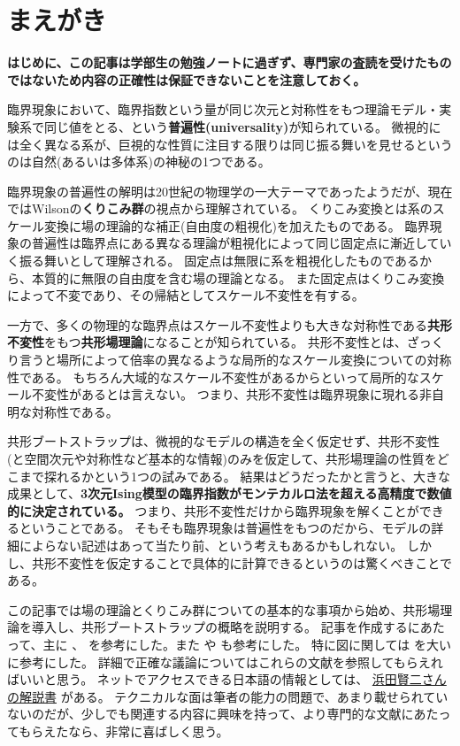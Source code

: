 \documentclass[\main/main.tex]{subfiles}
\begin{document}
\setcounter{section}{-1}
\section{
    まえがき
}
\textbf{はじめに、この記事は学部生の勉強ノートに過ぎず、専門家の査読を受けたものではないため内容の正確性は保証できないことを注意しておく。}

臨界現象において、臨界指数という量が同じ次元と対称性をもつ理論モデル・実験系で同じ値をとる、という\textbf{普遍性(universality)}が知られている。
微視的には全く異なる系が、巨視的な性質に注目する限りは同じ振る舞いを見せるというのは自然(あるいは多体系)の神秘の1つである。

臨界現象の普遍性の解明は20世紀の物理学の一大テーマであったようだが、現在ではWilsonの\textbf{くりこみ群}の視点から理解されている。
くりこみ変換とは系のスケール変換に場の理論的な補正(自由度の粗視化)を加えたものである。
臨界現象の普遍性は臨界点にある異なる理論が粗視化によって同じ固定点に漸近していく振る舞いとして理解される。
固定点は無限に系を粗視化したものであるから、本質的に無限の自由度を含む場の理論となる。
また固定点はくりこみ変換によって不変であり、その帰結としてスケール不変性を有する。

一方で、多くの物理的な臨界点はスケール不変性よりも大きな対称性である\textbf{共形不変性}をもつ\textbf{共形場理論}になることが知られている。
共形不変性とは、ざっくり言うと場所によって倍率の異なるような局所的なスケール変換についての対称性である。
もちろん大域的なスケール不変性があるからといって局所的なスケール不変性があるとは言えない。
つまり、共形不変性は臨界現象に現れる非自明な対称性である。

共形ブートストラップは、微視的なモデルの構造を全く仮定せず、共形不変性(と空間次元や対称性など基本的な情報)のみを仮定して、共形場理論の性質をどこまで探れるかという1つの試みである。
結果はどうだったかと言うと、大きな成果として、\textbf{3次元Ising模型の臨界指数がモンテカルロ法を超える高精度で数値的に決定されている。}
つまり、共形不変性だけから臨界現象を解くことができるということである。
そもそも臨界現象は普遍性をもつのだから、モデルの詳細によらない記述はあって当たり前、という考えもあるかもしれない。
しかし、共形不変性を仮定することで具体的に計算できるというのは驚くべきことである。

この記事では場の理論とくりこみ群についての基本的な事項から始め、共形場理論を導入し、共形ブートストラップの概略を説明する。
記事を作成するにあたって、主に
\cite{simmonsduffin2016tasi}
、
\cite{Nakayama_2019}
を参考にした。また
\cite{Rychkov_2017}
や
\cite{Hikita_2020}
も参考にした。
特に図に関しては
\cite{simmonsduffin2016tasi}
を大いに参考にした。
詳細で正確な議論についてはこれらの文献を参照してもらえればいいと思う。
ネットでアクセスできる日本語の情報としては、
\href{https://research.kek.jp/people/hamada/conformal%20field%20theory.pdf}{浜田賢二さんの解説書}
がある。
テクニカルな面は筆者の能力の問題で、あまり載せられていないのだが、少しでも関連する内容に興味を持って、より専門的な文献にあたってもらえたなら、非常に喜ばしく思う。
\end{document}
